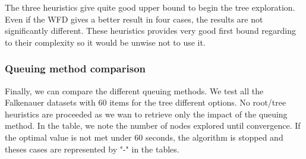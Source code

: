 The three heuristics give quite good upper bound to begin the tree exploration. Even if the WFD gives a better result in four cases, the results are not significantly different. These heuristics provides very good first bound regarding to their complexity so it would be unwise not to use it.

\subsubsection{Queuing method comparison}

Finally, we can compare the different queuing methods. We test all the Falkenauer datasets with 60 items for the tree different options. No root/tree heuristics are proceeded as we wan to retrieve only the impact of the queuing method. In the table, we note the number of nodes explored until convergence. If the optimal value is not met under 60 seconds, the algorithm is stopped and theses cases are represented by "-" in the tables.

